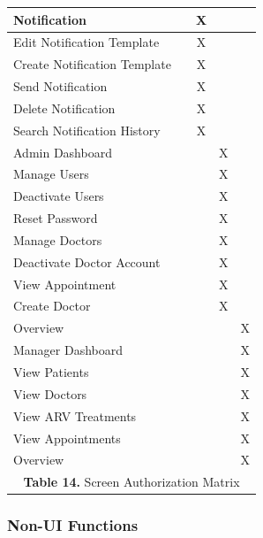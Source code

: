 \documentclass[12pt,a4paper]{article}
\begin{document}
\begin{longtable}{|p{5cm}|c|c|c|c|}
\hline
Notification &  & X &  &  \\
\hline
Edit Notification Template &  & X &  &  \\
\hline
Create Notification Template &  & X &  &  \\
\hline
Send Notification &  & X &  &  \\
\hline
Delete Notification &  & X &  &  \\
\hline
Search Notification History &  & X &  &  \\
\hline
Admin Dashboard &  &  & X &  \\
\hline
Manage Users &  &  & X &  \\
\hline
Deactivate Users &  &  & X &  \\
\hline
Reset Password &  &  & X &  \\
\hline
Manage Doctors &  &  & X &  \\
\hline
Deactivate Doctor Account &  &  & X &  \\
\hline
View Appointment &  &  & X &  \\
\hline
Create Doctor &  &  & X &  \\
\hline
Overview &  &  &  & X \\
\hline
Manager Dashboard &  &  &  & X \\
\hline
View Patients &  &  &  & X \\
\hline
View Doctors &  &  &  & X \\
\hline
View ARV Treatments &  &  &  & X \\
\hline
View Appointments &  &  &  & X \\
\hline
Overview &  &  &  & X \\
\hline
\multicolumn{5}{|c|}{\textbf{Table 14.} Screen Authorization Matrix} \\
\hline
\end{longtable}


\subsubsection{Non-UI Functions}
\end{document}
